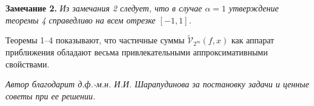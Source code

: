 \documentclass[12pt]{book}
\begin{document}


\noindent\textbf{Замечание 2. }\textit{
Из замечания 2 следует, что в случае $\alpha = 1$ утверждение теоремы 4 справедливо на всем отрезке $[-1, 1]$.
}


Теоремы 1--4 показывают, что частичные суммы $\tilde{\mathcal{V}}_{2^m}(f,x)$ как аппарат приближения обладают весьма привлекательными аппроксимативными свойствами.




\vspace*{10mm}

\noindent \textit{Автор благодарит д.ф.-м.н. И.И. Шарапудинова за постановку задачи и ценные советы при ее решении.}




\vspace*{3mm}
\end{document}
